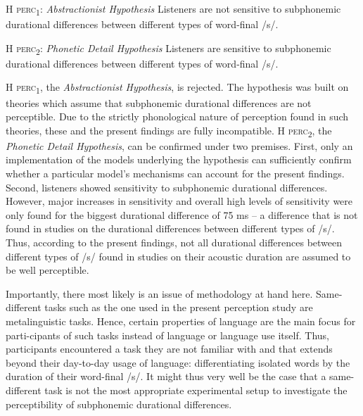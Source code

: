 \begin{description}
\item\textsc{H perc\textsubscript{1}}: \textit{Abstractionist Hypothesis} \newline
Listeners are not sensitive to subphonemic durational differences between different types of word-final /s/.

\item\textsc{H perc\textsubscript{2}}: \textit{Phonetic Detail Hypothesis} \newline
Listeners are sensitive to subphonemic durational differences between different types of word-final /s/.
\end{description}

\textsc{H perc\textsubscript{1}}, the \textit{Abstractionist Hypothesis}, is rejected. The hypothesis was built on theories which assume that subphonemic durational differences are not perceptible. Due to the strictly phonological nature of perception found in such theories, these and the present findings are fully incompatible. \textsc{H perc\textsubscript{2}}, the \textit{Phonetic Detail Hypothesis}, can be confirmed under two premises. First, only an implementation of the models underlying the hypothesis can sufficiently confirm whether a particular model’s mechanisms can account for the present findings. Second, listeners showed sensitivity to subphonemic durational differences. However, major increases in sensitivity and overall high levels of sensitivity were only found for the biggest durational difference of 75 ms – a difference that is not found in studies on the durational differences between different types of /s/. Thus, according to the present findings, not all durational differences between different types of /s/ found in studies on their acoustic duration are assumed to be well perceptible. 

Importantly, there most likely is an issue of methodology at hand here. Same-different tasks such as the one used in the present perception study are metalinguistic tasks. Hence, certain properties of language are the main focus for parti-cipants of such tasks instead of language or language use itself. Thus, participants encountered a task they are not familiar with and that extends beyond their day-to-day usage of language: differentiating isolated words by the duration of their word-final /s/. It might thus very well be the case that a same-different task is not the most appropriate experimental setup to investigate the perceptibility of subphonemic durational differences.

